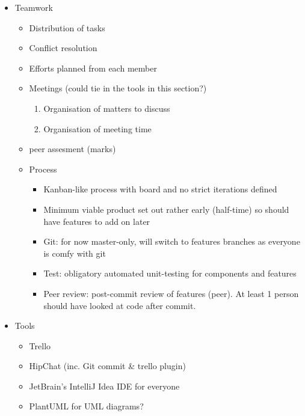 \begin{itemize}
	\item Teamwork
	\begin{itemize}
		\item Distribution of tasks
    	\item Conflict resolution
    	\item Efforts planned from each member
    	\item Meetings (could tie in the tools in this section?)
        \begin{enumerate}
            \item Organisation of matters to discuss
            \item Organisation of meeting time
        \end{enumerate}
        \item peer assesment (marks)

        \item Process
        \begin{itemize}
            \item Kanban-like process with board and no strict iterations defined
            \item Minimum viable product set out rather early (half-time) so should have features to add on later
            \item Git: for now master-only, will switch to features branches as everyone is comfy with git
            \item Test: obligatory automated unit-testing for components and features
            \item Peer review: post-commit review of features (peer). At least 1 person should have looked at code after commit.
        \end{itemize}
	\end{itemize}

	\item Tools
	\begin{itemize}
		\item Trello
		\item HipChat (inc. Git commit & trello plugin)
	    \item JetBrain's IntelliJ Idea IDE for everyone
	    \item PlantUML for UML diagrams?
	\end{itemize}

\end{itemize}



